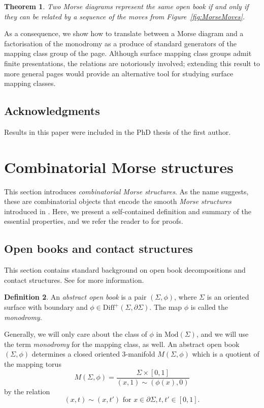 \documentclass{amsart}
\newtheorem{theorem}{Theorem}[section]
\theoremstyle{definition}
\newtheorem{definition}[theorem]{Definition}
\begin{document}
\begin{theorem}\label{prop:OBDMorseEquivalence}
Two Morse diagrams represent the same open book  if and only if they can be related by a sequence of the moves from Figure~\ref{fig:MorseMoves}.
\end{theorem}

As a consequence, we show how to translate between a Morse diagram and a factorisation of the monodromy as a produce of standard generators of the mapping class group of the page.  Although surface mapping class groups admit finite presentations, the relations are notoriously involved; extending this result to more general pages would provide an alternative tool for studying surface mapping classes.

\subsection{Acknowledgments}
 Results in this paper were included in the PhD thesis of the first author.


\section{Combinatorial Morse structures} 
 This section introduces \textit{combinatorial Morse structures}.  As the name suggests, these are combinatorial objects that encode the smooth \textit{Morse structures} introduced in \cite{GL}.  Here, we present a self-contained definition and summary of the essential properties, and we refer the reader to \cite{GL} for proofs.
 
 
\subsection{Open books and contact structures}

This section contains standard background on open book decompositions and contact structures.  See \cite{Etnyre} for more information.


\begin{definition}
An \emph{abstract open book} is a pair $(\Sigma,\phi)$, where $\Sigma$ is an oriented surface with boundary and $\phi\in \text{Diff}^{+}(\Sigma,\partial\Sigma)$. The map  $\phi$ is called the \emph{monodromy}.
\end{definition}

Generally, we will only care about the class of $\phi$ in $\text{Mod}(\Sigma)$, and we will use the term \emph{monodromy} for the mapping class, as well. An abstract open book $(\Sigma,\phi)$ determines a closed oriented 3-manifold $M(\Sigma,\phi)$ which is a quotient of the mapping torus
\[
M(\Sigma,\phi) = \frac{\Sigma\times[0,1]}{(x,1)\sim(\phi(x),0)}
\]
by the relation
\[
 (x,t)\sim(x, t') \text{ for } x \in \partial\Sigma,  t,t'\in [0,1].
\]
\end{document}
